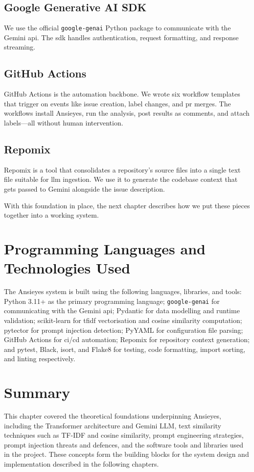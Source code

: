 \subsection{Google Generative AI SDK}
We use the official \texttt{google-genai} Python package to communicate with the Gemini \gls{api}. The \gls{sdk} handles authentication, request formatting, and response streaming.

\subsection{GitHub Actions}
GitHub Actions is the automation backbone. We wrote six workflow templates that trigger on events like issue creation, label changes, and \gls{pr} merges. The workflows install Ansieyes, run the analysis, post results as comments, and attach labels---all without human intervention.

\subsection{Repomix}
Repomix is a tool that consolidates a repository's source files into a single text file suitable for \gls{llm} ingestion. We use it to generate the codebase context that gets passed to Gemini alongside the issue description.

With this foundation in place, the next chapter describes how we put these pieces together into a working system.

\section{Programming Languages and Technologies Used}

The Ansieyes system is built using the following languages, libraries, and tools: Python 3.11+ as the primary programming language; \texttt{google-genai} for communicating with the Gemini \gls{api}; Pydantic for data modelling and runtime validation; scikit-learn for \gls{tfidf} vectorisation and cosine similarity computation; pytector for prompt injection detection; PyYAML for configuration file parsing; GitHub Actions for \gls{ci}/\gls{cd} automation; Repomix for repository context generation; and pytest, Black, isort, and Flake8 for testing, code formatting, import sorting, and linting respectively.

\section{Summary}

This chapter covered the theoretical foundations underpinning Ansieyes, including the Transformer architecture and Gemini LLM, text similarity techniques such as TF-IDF and cosine similarity, prompt engineering strategies, prompt injection threats and defences, and the software tools and libraries used in the project. These concepts form the building blocks for the system design and implementation described in the following chapters.
